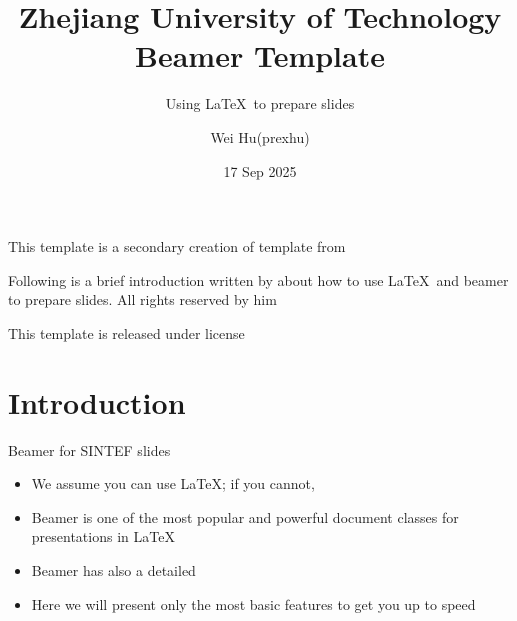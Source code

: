 \documentclass{beamer}
\title{Zhejiang University of Technology Beamer Template}
\subtitle{Using \LaTeX\ to prepare slides}
\author{Wei Hu(prexhu)}
\date{17 Sep 2025}
\begin{document}
    
    \maketitle
    
    \begin{frame}
        This template is a secondary creation of  template from  \vspace{\baselineskip}
        
        Following is a brief introduction written by  about how to use \LaTeX\ and beamer to prepare slides. All rights reserved by him\vspace{\baselineskip}
        
        This template is released under  license
    \end{frame}
    
    \section{Introduction}
    
    \begin{frame}{Beamer for SINTEF slides}
        \begin{itemize}
            \item We assume you can use \LaTeX; if you cannot, 
            \item Beamer is one of the most popular and powerful document classes for presentations in \LaTeX
            \item Beamer has also a detailed 
            \item Here we will present only the most basic features to get you up to speed
        \end{itemize}
    \end{frame}
    
\end{document}
